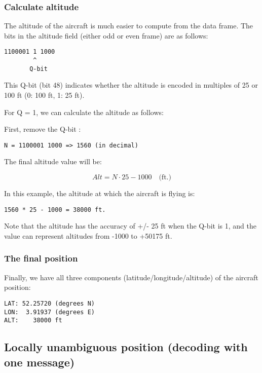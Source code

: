 \subsubsection{Calculate altitude}\label{calculate-altitude}

The altitude of the aircraft is much easier to compute from the data frame. The bits in the altitude field (either odd or even frame) are as follows:

\begin{verbatim}
1100001 1 1000
        ^
       Q-bit
\end{verbatim}

This Q-bit (bit 48) indicates whether the altitude is encoded in multiples of 25 or 100 ft (0: 100 ft, 1: 25 ft).

For Q = 1, we can calculate the altitude as follows:

First, remove the Q-bit :

\begin{verbatim}
N = 1100001 1000 => 1560 (in decimal)
\end{verbatim}

The final altitude value will be:

\begin{equation}
  Alt = N \cdot 25 - 1000 \quad \text{(ft.)}
\end{equation}

In this example, the altitude at which the aircraft is flying is:

\begin{verbatim}
1560 * 25 - 1000 = 38000 ft.
\end{verbatim}

Note that the altitude has the accuracy of +/- 25 ft when the Q-bit is 1, and the value can represent altitudes from -1000 to +50175 ft.

\subsubsection{The final position}\label{the-final-position}

Finally, we have all three components (latitude/longitude/altitude) of the aircraft position:

\begin{verbatim}
LAT: 52.25720 (degrees N)
LON:  3.91937 (degrees E)
ALT:    38000 ft
\end{verbatim}

\subsection{Locally unambiguous position (decoding with one
message)}\label{locally-unambiguous-position-decoding-with-one-message}

